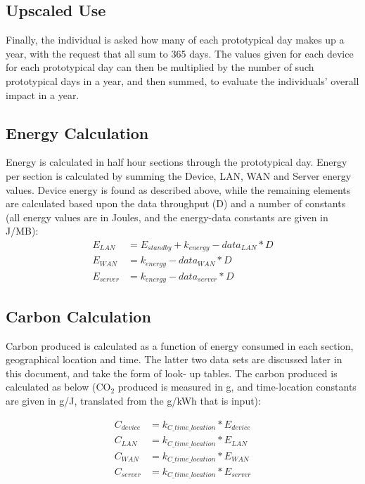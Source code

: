 \documentclass[conference]{IEEEtran}
\begin{document}
\subsection{Upscaled Use}

Finally, the individual is asked how many of each prototypical day
makes up a year, with the request that all sum to 365 days. The values
given for each device for each prototypical day can then be multiplied
by the number of such prototypical days in a year, and then summed, to
evaluate the individuals' overall impact in a year.

\subsection{Energy Calculation}

Energy is calculated in half hour sections through the prototypical
day. Energy per section is calculated by summing the Device, LAN, WAN
and Server energy values. Device energy is found as described above,
while the remaining elements are calculated based upon the data
throughput (D) and a number of constants (all energy values are in
Joules, and the energy-data constants are given in J/MB):
\begin{align*}
E_{LAN} &= E_{standby} + k_{energy}-data_{LAN} * D\\
E_{WAN} &= k_{energy}-data_{WAN} * D\\
E_{server} &= k_{energy}-data_{server} * D
\end{align*}

\subsection{Carbon Calculation}

Carbon produced is calculated as a function of energy consumed in each
section, geographical location and time. The latter two data sets are
discussed later in this document, and take the form of look- up
tables. The carbon produced is calculated as below (CO$_2$ produced is
measured in g, and time-location constants are given in g/J,
translated from the g/kWh that is input):

\begin{align*}
C_{device} &= k_{C\_time\_location} * E_{device}\\
C_{LAN} &= k_{C\_time\_location} * E_{LAN}\\
C_{WAN} &= k_{C\_time\_location} * E_{WAN}\\
C_{server} &= k_{C\_time\_location} * E_{server}
\end{align*}
\end{document}
